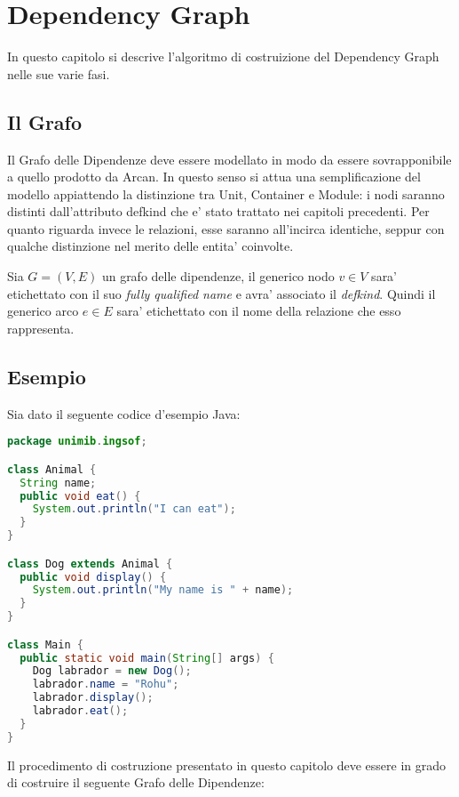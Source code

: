 \chapter{Dependency Graph}

In questo capitolo si descrive l'algoritmo di costruizione del Dependency Graph nelle sue varie fasi.

\section{Il Grafo}

Il Grafo delle Dipendenze deve essere modellato in modo da essere sovrapponibile a quello prodotto da Arcan.
In questo senso si attua una semplificazione del modello appiattendo la distinzione tra Unit, Container e Module: i nodi saranno distinti dall'attributo defkind che e' stato trattato nei capitoli precedenti.
Per quanto riguarda invece le relazioni, esse saranno all'incirca identiche, seppur con qualche distinzione nel merito delle entita' coinvolte.

Sia $G = (V, E)$ un grafo delle dipendenze, il generico nodo $v \in V$ sara' etichettato con il suo \emph{fully qualified name} e avra' associato il \emph{defkind}.
Quindi il generico arco $e \in E$ sara' etichettato con il nome della relazione che esso rappresenta.

\section{Esempio}

Sia dato il seguente codice d'esempio Java:

\begin{lstlisting}[language=Java]
package unimib.ingsof;

class Animal {
  String name;
  public void eat() {
    System.out.println("I can eat");
  }
}

class Dog extends Animal {
  public void display() {
    System.out.println("My name is " + name);
  }
}

class Main {
  public static void main(String[] args) {
    Dog labrador = new Dog();
    labrador.name = "Rohu";
    labrador.display();
    labrador.eat();
  }
}
\end{lstlisting}

Il procedimento di costruzione presentato in questo capitolo deve essere in grado di costruire il seguente Grafo delle Dipendenze:


